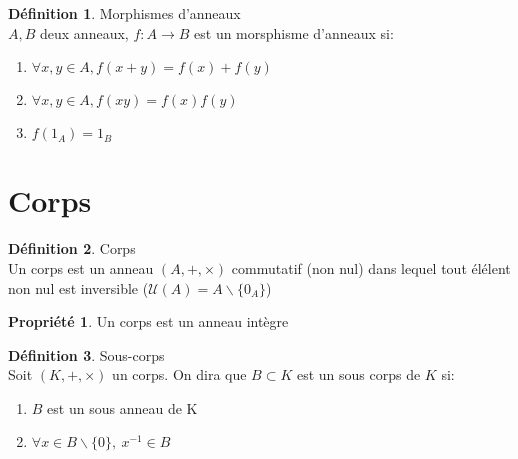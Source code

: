 \documentclass[fleqn]{article}
\theoremstyle{definition} \newtheorem*{defi}{D\'efinition}
\theoremstyle{definition} \newtheorem*{theo}{Th\'eor\`eme}
\theoremstyle{definition} \newtheorem*{coro}{Corollaire}
\theoremstyle{definition} \newtheorem*{nota}{Notation}
\theoremstyle{remark} \newtheorem*{rqs}{Remarques}
\theoremstyle{definition} \newtheorem*{prop}{Propri\'et\'e}
\begin{document}
\begin{defi} Morphismes d'anneaux \\
	$A, B$ deux anneaux, $f:A \rightarrow B$ est un morsphisme d'anneaux si:
	\begin{enumerate}
		\item $\forall x,y \in A, f(x+y) = f(x) + f(y)$
		\item $\forall x,y \in A, f(xy) = f(x)f(y)$
		\item $f(1_A) = 1_B$
	\end{enumerate}
\end{defi}

\section{Corps}
\begin{defi} Corps \\
	Un corps est un anneau $(A,+,\times)$ commutatif (non nul) dans lequel tout \'el\'elent non nul est inversible
	($\mathcal{U}(A) = A\backslash\{0_A\}$)
\end{defi}

\begin{prop}
	Un corps est un anneau int\`egre
\end{prop}

\begin{defi} Sous-corps \\
	Soit $(K,+,\times)$ un corps. On dira que $B \subset K$ est un sous corps de $K$ si:
	\begin{enumerate}
		\item $B$ est un sous anneau de K
		\item $\forall x \in B\backslash\{0\},\ x^{-1} \in B$
	\end{enumerate}
\end{defi}
\end{document}
